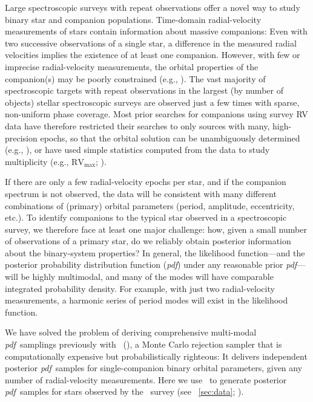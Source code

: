 \documentclass[modern, letterpaper]{aastex62}
\newcommand{\apogee}{\project{\acronym{APOGEE}}}
\newcommand{\thejoker}{\project{The~Joker}}
\newcommand{\pdf}{\textit{pdf}}
\begin{document}
Large spectroscopic surveys with repeat observations offer a novel way to study
binary star and companion populations.
Time-domain radial-velocity measurements of stars contain information about
massive companions: Even with two successive observations of a single star, a
difference in the measured radial velocities implies the existence of at least
one companion.
However, with few or imprecise radial-velocity measurements, the orbital
properties of the companion(s) may be poorly constrained (e.g.,
\citealt{Price-Whelan:2017}).
The vast majority of spectroscopic targets with repeat observations in the
largest (by number of objects) stellar spectroscopic surveys are observed just a
few times with sparse, non-uniform phase coverage.
Most prior searches for companions using survey RV data have therefore
restricted their searches to only sources with many, high-precision epochs, so
that the orbital solution can be unambiguously determined (e.g.,
\citealt{Troup:2016}), or have used simple statistics computed from the data to
study multiplicity (e.g., $\textrm{RV}_\textrm{max}$; \citealt{Badenes:2017}).

If there are only a few radial-velocity epochs per star, and if the companion
spectrum is not observed, the data will be consistent with many different
combinations of (primary) orbital parameters (period, amplitude, eccentricity,
etc.).
To identify companions to the typical star observed in a spectroscopic survey,
we therefore face at least one major challenge: how, given a small number of
observations of a primary star, do we reliably obtain posterior information
about the binary-system properties?
In general, the likelihood function---and the posterior probability distribution
function (\pdf) under any reasonable prior \pdf---will be highly multimodal, and
many of the modes will have comparable integrated probability density.
For example, with just two radial-velocity measurements, a harmonic series of
period modes will exist in the likelihood function.

We have solved the problem of deriving comprehensive multi-modal \pdf\ samplings
previously with \thejoker\ (\citealt{Price-Whelan:2017}), a Monte Carlo
rejection sampler that is computationally expensive but probabilistically
righteous:
It delivers independent posterior \pdf\ samples for single-companion binary
orbital parameters, given any number of radial-velocity measurements.
Here we use \thejoker\ to generate posterior \pdf\ samples for stars observed by
the \apogee\ survey (see \sectionname~\ref{sec:data}; \citealt{Majewski:2017}).
\end{document}
